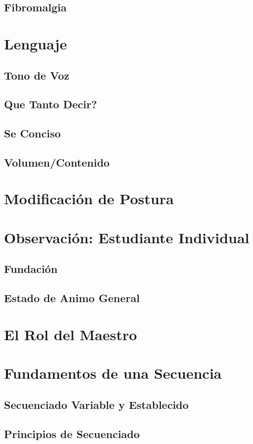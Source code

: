 \subsection{Fibromalgia}
\section{Lenguaje}
\subsection{Tono de Voz}
\subsection{Que Tanto Decir?}
\subsection{Se Conciso}
\subsection{Volumen/Contenido}
\section{Modificación de Postura}
\section{Observación: Estudiante Individual}
\subsection{Fundación}
\subsection{Estado de Animo General}
\section{El Rol del Maestro}
\section{Fundamentos de una Secuencia}
\label{sec:fundSec}
\subsection{Secuenciado Variable y Establecido}
\subsection{Principios de Secuenciado}
